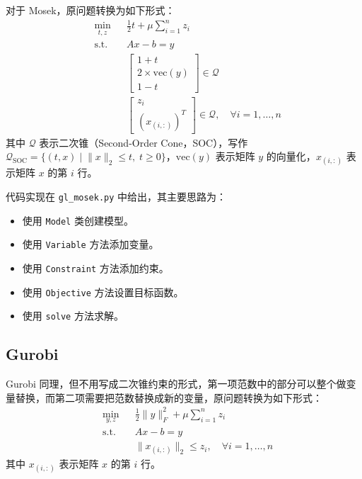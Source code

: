 \documentclass[journal, a4paper]{IEEEtran}
\begin{document}
对于 Mosek，原问题转换为如下形式：
\begin{align*}
    & \underset{t, z}{\min} & & \frac{1}{2} t + \mu \sum_{i=1}^{n} z_i \\
    & \text{s.t.} & & Ax - b = y \\
    & & & \begin{bmatrix}
        1 + t \\
        2 \times \text{vec}(y) \\
        1 - t
    \end{bmatrix} \in \mathcal{Q} \\
    & & & \begin{bmatrix}
        z_i \\
        (x_{(i,:)})^T
    \end{bmatrix} \in \mathcal{Q}, \quad \forall i = 1, \ldots, n
\end{align*}
其中 $\mathcal{Q}$ 表示二次锥（Second-Order Cone，SOC），写作$\mathcal{Q}_{\text{SOC}} = \{(t, x) \mid \lVert x \rVert_2 \leq t, \; t \geq 0\}$，$\text{vec}(y)$ 表示矩阵 $y$ 的向量化，$x_{(i,:)}$ 表示矩阵 $x$ 的第 $i$ 行。

代码实现在 \texttt{gl\_mosek.py} 中给出，其主要思路为：
\begin{itemize}
    \item 使用 \texttt{Model} 类创建模型。
    \item 使用 \texttt{Variable} 方法添加变量。
    \item 使用 \texttt{Constraint} 方法添加约束。
    \item 使用 \texttt{Objective} 方法设置目标函数。
    \item 使用 \texttt{solve} 方法求解。
\end{itemize}

\subsection{\textbf{Gurobi}}
Gurobi 同理，但不用写成二次锥约束的形式，第一项范数中的部分可以整个做变量替换，而第二项需要把范数替换成新的变量，原问题转换为如下形式：
\begin{align*}
    & \underset{y, z}{\min} & & \frac{1}{2} \|y\|_F^2 + \mu \sum_{i=1}^{n} z_i \\
    & \text{s.t.} & & Ax - b = y \\
    & & & \|x_{(i, : )}\|_2 \leq z_i, \quad \forall i = 1, \ldots, n
\end{align*}
其中 $x_{(i,:)}$ 表示矩阵 $x$ 的第 $i$ 行。
\end{document}
